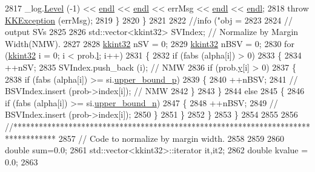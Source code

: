 \begin{DoxyCode}
2817         \_log.\hyperlink{class_k_k_b_1_1_run_log_a32cf761d7f2e747465fd80533fdbb659}{Level} (-1) << \hyperlink{namespace_k_k_b_ad1f50f65af6adc8fa9e6f62d007818a8}{endl} << \hyperlink{namespace_k_k_b_ad1f50f65af6adc8fa9e6f62d007818a8}{endl} << errMsg << \hyperlink{namespace_k_k_b_ad1f50f65af6adc8fa9e6f62d007818a8}{endl} << 
      \hyperlink{namespace_k_k_b_ad1f50f65af6adc8fa9e6f62d007818a8}{endl};
2818         \textcolor{keywordflow}{throw} \hyperlink{class_k_k_b_1_1_k_k_exception}{KKException} (errMsg);
2819       \}
2820   \}
2821 
2822   \textcolor{comment}{//info ("obj = %
2823 
2824   \textcolor{comment}{// output SVs}
2825 
2826   std::vector<kkint32> SVIndex;     \textcolor{comment}{// Normalize by Margin Width(NMW).}
2827 
2828   \hyperlink{namespace_k_k_b_a8fa4952cc84fda1de4bec1fbdd8d5b1b}{kkint32} nSV   = 0;
2829   \hyperlink{namespace_k_k_b_a8fa4952cc84fda1de4bec1fbdd8d5b1b}{kkint32} nBSV  = 0;
2830   \textcolor{keywordflow}{for}  (\hyperlink{namespace_k_k_b_a8fa4952cc84fda1de4bec1fbdd8d5b1b}{kkint32} i = 0;  i < prob.\hyperlink{struct_s_v_m289___b_f_s_1_1svm__problem_afd75fe2ff65aa0c0f27b85b04028b2f3}{l};  i++)
2831   \{
2832     \textcolor{keywordflow}{if}  (fabs (alpha[i]) > 0)
2833     \{
2834       ++nSV;
2835       SVIndex.push\_back (i);    \textcolor{comment}{// NMW}
2836       \textcolor{keywordflow}{if}  (prob.\hyperlink{struct_s_v_m289___b_f_s_1_1svm__problem_a6a79c81e0e6251913062a811c87d9325}{y}[i] > 0)
2837       \{
2838         \textcolor{keywordflow}{if}  (fabs (alpha[i]) >= si.\hyperlink{struct_s_v_m289___b_f_s_1_1_solver_1_1_solution_info_a06cbde68d648800d92969dd4509050fe}{upper\_bound\_p})
2839         \{
2840           ++nBSV;
2841           \textcolor{comment}{// BSVIndex.insert (prob->index[i]);   // NMW}
2842         \}
2843       \}
2844       \textcolor{keywordflow}{else}
2845       \{
2846         \textcolor{keywordflow}{if}  (fabs (alpha[i]) >= si.\hyperlink{struct_s_v_m289___b_f_s_1_1_solver_1_1_solution_info_aacda21688b31ff854b0e17ae458f6d42}{upper\_bound\_n})
2847         \{
2848           ++nBSV;
2849           \textcolor{comment}{// BSVIndex.insert (prob->index[i]);}
2850         \}
2851       \}
2852     \}
2853   \}
2854 
2855 
2856   \textcolor{comment}{//**********************************************************************************}
2857   \textcolor{comment}{//  Code to normalize by margin width.}
2858 
2859   
2860   \textcolor{keywordtype}{double} sum=0.0;
2861   std::vector<kkint32>::iterator it,it2;
2862   \textcolor{keywordtype}{double} kvalue = 0.0;
2863 
}
\end{DoxyCode}
